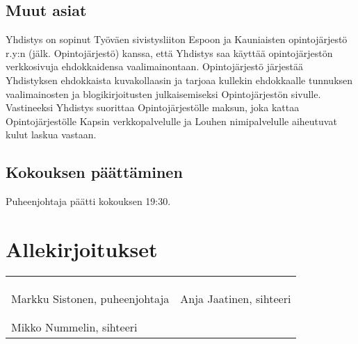 \documentclass[a4paper,12pt]{article}
\begin{document}
\subsection{Muut asiat}
Yhdistys on sopinut Työväen sivistysliiton Espoon ja Kauniaisten opintojärjestö r.y:n (jälk. Opintojärjestö) kanssa, että Yhdistys saa käyttää opintojärjestön verkkosivuja ehdokkaidensa vaalimainontaan. Opintojärjestö järjestää Yhdistyksen ehdokkaista kuvakollaasin ja tarjoaa kullekin ehdokkaalle tunnuksen vaalimainosten ja blogikirjoitusten julkaisemiseksi Opintojärjestön sivulle. Vastineeksi Yhdistys suorittaa Opintojärjestölle maksun, joka kattaa Opintojärjestölle Kapsin verkkopalvelulle ja Louhen nimipalvelulle aiheutuvat kulut laskua vastaan.
\subsection{Kokouksen päättäminen}
Puheenjohtaja päätti kokouksen 19:30.
\section*{Allekirjoitukset}
\begin{flushleft}
\begin{tabular}{ll}
& \\
& \\
& \\
Markku Sistonen, puheenjohtaja &
Anja Jaatinen, sihteeri
& \\
& \\
& \\
Mikko Nummelin, sihteeri
\end{tabular}
\end{flushleft}
\end{document}
